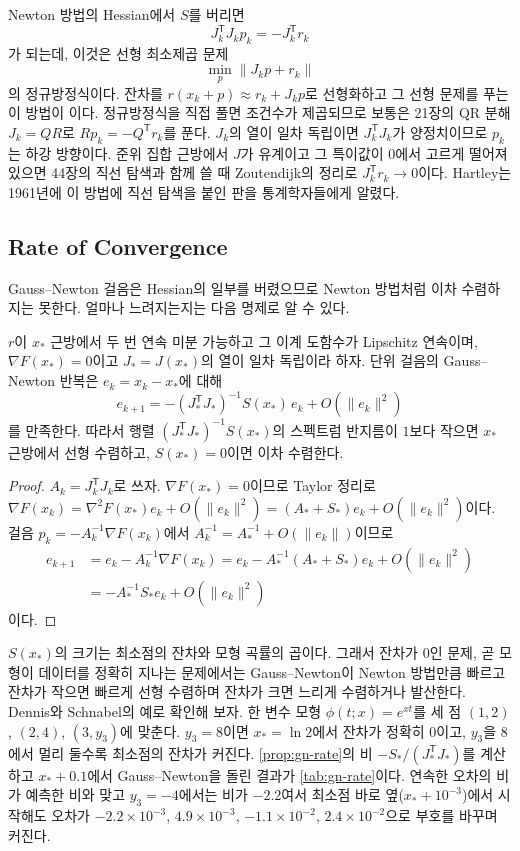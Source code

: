 Newton 방법의 Hessian에서 $S$를 버리면
\[
J_k^{\mathsf T}J_kp_k=-J_k^{\mathsf T}r_k
\]
가 되는데, 이것은 선형 최소제곱 문제
\[
\min_p\|J_kp+r_k\|
\]
의 정규방정식이다. 잔차를 $r(x_k+p)\approx r_k+J_kp$로 선형화하고 그 선형 문제를 푸는 이 방법이 이다. 정규방정식을 직접 풀면 조건수가 제곱되므로 보통은 21장의 QR 분해 $J_k=QR$로 $Rp_k=-Q^{\mathsf T}r_k$를 푼다. $J_k$의 열이 일차 독립이면 $J_k^{\mathsf T}J_k$가 양정치이므로 $p_k$는 하강 방향이다. 준위 집합 근방에서 $J$가 유계이고 그 특이값이 $0$에서 고르게 떨어져 있으면 44장의 직선 탐색과 함께 쓸 때 Zoutendijk의 정리로 $J_k^{\mathsf T}r_k\to0$이다. Hartley는 1961년에 이 방법에 직선 탐색을 붙인 판을 통계학자들에게 알렸다\cite{hartley1961}.

\subsection{Rate of Convergence}

Gauss--Newton 걸음은 Hessian의 일부를 버렸으므로 Newton 방법처럼 이차 수렴하지는 못한다. 얼마나 느려지는지는 다음 명제로 알 수 있다.

\begin{proposition}
\label{prop:gn-rate}
$r$이 $x_\ast$ 근방에서 두 번 연속 미분 가능하고 그 이계 도함수가 Lipschitz 연속이며, $\nabla F(x_\ast)=0$이고 $J_\ast=J(x_\ast)$의 열이 일차 독립이라 하자. 단위 걸음의 Gauss--Newton 반복은 $e_k=x_k-x_\ast$에 대해
\[
e_{k+1}=-(J_\ast^{\mathsf T}J_\ast)^{-1}S(x_\ast)\,e_k+O(\|e_k\|^2)
\]
를 만족한다. 따라서 행렬 $(J_\ast^{\mathsf T}J_\ast)^{-1}S(x_\ast)$의 스펙트럼 반지름이 $1$보다 작으면 $x_\ast$ 근방에서 선형 수렴하고, $S(x_\ast)=0$이면 이차 수렴한다.
\end{proposition}

\begin{proof}
$A_k=J_k^{\mathsf T}J_k$로 쓰자. $\nabla F(x_\ast)=0$이므로 Taylor 정리로 $\nabla F(x_k)=\nabla^2F(x_\ast)e_k+O(\|e_k\|^2)=(A_\ast+S_\ast)e_k+O(\|e_k\|^2)$이다. 걸음 $p_k=-A_k^{-1}\nabla F(x_k)$에서 $A_k^{-1}=A_\ast^{-1}+O(\|e_k\|)$이므로
\begin{align*}
e_{k+1}&=e_k-A_k^{-1}\nabla F(x_k)=e_k-A_\ast^{-1}(A_\ast+S_\ast)e_k+O(\|e_k\|^2)\\
&=-A_\ast^{-1}S_\ast e_k+O(\|e_k\|^2)
\end{align*}
이다.
\end{proof}

$S(x_\ast)$의 크기는 최소점의 잔차와 모형 곡률의 곱이다. 그래서 잔차가 $0$인 문제, 곧 모형이 데이터를 정확히 지나는 문제에서는 Gauss--Newton이 Newton 방법만큼 빠르고 잔차가 작으면 빠르게 선형 수렴하며 잔차가 크면 느리게 수렴하거나 발산한다. Dennis와 Schnabel의 예\cite{dennis1996}로 확인해 보자. 한 변수 모형 $\phi(t;x)=e^{xt}$를 세 점 $(1,2)$, $(2,4)$, $(3,y_3)$에 맞춘다. $y_3=8$이면 $x_\ast=\ln2$에서 잔차가 정확히 $0$이고, $y_3$을 $8$에서 멀리 둘수록 최소점의 잔차가 커진다. \cref{prop:gn-rate}의 비 $-S_\ast/(J_\ast^{\mathsf T}J_\ast)$를 계산하고 $x_\ast+0.1$에서 Gauss--Newton을 돌린 결과가 \cref{tab:gn-rate}이다. 연속한 오차의 비가 예측한 비와 맞고 $y_3=-4$에서는 비가 $-2.2$여서 최소점 바로 옆($x_\ast+10^{-3}$)에서 시작해도 오차가 $-2.2\times10^{-3}$, $4.9\times10^{-3}$, $-1.1\times10^{-2}$, $2.4\times10^{-2}$으로 부호를 바꾸며 커진다.

